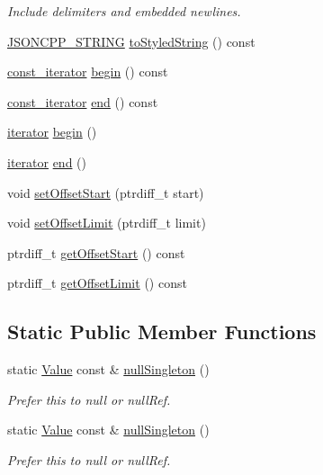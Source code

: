 \begin{DoxyCompactItemize}
\begin{DoxyCompactList}\small\item\em Include delimiters and embedded newlines. \end{DoxyCompactList}\item 
\hyperlink{config_8h_a1e723f95759de062585bc4a8fd3fa4be}{J\+S\+O\+N\+C\+P\+P\+\_\+\+S\+T\+R\+I\+NG} \hyperlink{class_json_1_1_value_a00154cc8662d7a845ed59e175c2496cb}{to\+Styled\+String} () const
\item 
\hyperlink{class_json_1_1_value_af92282ca92b58b320debd486afb7696a}{const\+\_\+iterator} \hyperlink{class_json_1_1_value_a42f2fac40a6b5f4ef6abe0a5c314d1ba}{begin} () const
\item 
\hyperlink{class_json_1_1_value_af92282ca92b58b320debd486afb7696a}{const\+\_\+iterator} \hyperlink{class_json_1_1_value_a7aa85c7820d0157c0fc8540a727040a7}{end} () const
\item 
\hyperlink{class_json_1_1_value_a341cdf2e01f8b3c5b7317aa2f0768c53}{iterator} \hyperlink{class_json_1_1_value_acec156770bf554bee85279825d046fad}{begin} ()
\item 
\hyperlink{class_json_1_1_value_a341cdf2e01f8b3c5b7317aa2f0768c53}{iterator} \hyperlink{class_json_1_1_value_a2ac91976a65644bde515280767c7bcde}{end} ()
\item 
void \hyperlink{class_json_1_1_value_a92e32ea0f4f8a15853a3cf0beac9feb9}{set\+Offset\+Start} (ptrdiff\+\_\+t start)
\item 
void \hyperlink{class_json_1_1_value_a5e4f5853fec138150c5df6004a8c2bcf}{set\+Offset\+Limit} (ptrdiff\+\_\+t limit)
\item 
ptrdiff\+\_\+t \hyperlink{class_json_1_1_value_afa081dc764000951a1d8d6148155508e}{get\+Offset\+Start} () const
\item 
ptrdiff\+\_\+t \hyperlink{class_json_1_1_value_a2cdfa01935f87fcace90d450cbd2c0a4}{get\+Offset\+Limit} () const
\end{DoxyCompactItemize}
\subsection*{Static Public Member Functions}
\begin{DoxyCompactItemize}
\item 
static \hyperlink{class_json_1_1_value}{Value} const  \& \hyperlink{class_json_1_1_value_af2f124567acc35d021a424e53ebdfcab}{null\+Singleton} ()
\begin{DoxyCompactList}\small\item\em Prefer this to null or null\+Ref. \end{DoxyCompactList}\item 
static \hyperlink{class_json_1_1_value}{Value} const  \& \hyperlink{class_json_1_1_value_a48ce2d77935d7f280ba3e9899217a370}{null\+Singleton} ()
\begin{DoxyCompactList}\small\item\em Prefer this to null or null\+Ref. \end{DoxyCompactList}\end{DoxyCompactItemize}
